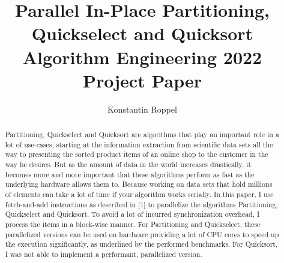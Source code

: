 \documentclass[sigconf]{acmart}
\begin{document}
\title[Parallel In-Place Partitioning, Quickselect and Quicksort using Fetch-and-add Instructions]{Parallel In-Place Partitioning, Quickselect and Quicksort\\\large Algorithm Engineering 2022 Project Paper}


\author{Konstantin Roppel}

\begin{abstract}

Partitioning, Quickselect and Quicksort are algorithms that play an important role in a lot of use-cases, starting at the information extraction from scientific data sets all the way to presenting the sorted product items of an online shop to the customer in the way he desires. But as the amount of data in the world increases drastically, it becomes more and more important that these algorithms perform as fast as the underlying hardware allows them to. Because working on data sets that hold millions of elements can take a lot of time if your algorithm works serially. In this paper, I use fetch-and-add instructions as described in [1] to parallelize the algorithms Partitioning, Quickselect and Quicksort. To avoid a lot of incurred synchronization overhead, I process the items in a block-wise manner. For Partitioning and Quickselect, these parallelized versions can be used on hardware providing a lot of CPU cores to speed up the execution significantly, as underlined by the performed benchmarks. For Quicksort, I was not able to implement a performant, parallelized version.

\end{abstract}


\maketitle
\end{document}
